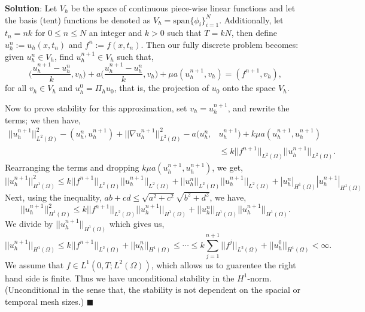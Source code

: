 \documentclass[11pt]{article}
\begin{document}
\textbf{Solution}: Let $V_h$ be the space of continuous piece-wise linear functions and let the basis (tent) functions be denoted as $V_h = \text{span}\{\phi_i\}_{i=1}^N$.
Additionally, let $t_n = nk$ for $0 \leq n \leq N$ an integer and $k > 0$ such that $T = kN$, then define $u_h^n := u_h(x, t_n)$ and $f^n := f(x, t_n)$.
Then our fully discrete problem becomes: given $u^n_h \in V_h$, find $u^{n+1}_h \in V_h$ such that,
\begin{equation*}
    \big( \frac{u^{n+1}_h - u^n_h}{k}, v_h \big) + a\big( \frac{u^{n+1}_h - u^n_h}{k}, v_h \big) + \mu a(u^{n+1}_h, v_h) = (f^{n+1},v_h),
\end{equation*}
for all $v_h \in V_h$ and $u^0_h = \Pi_h u_0$, that is, the projection of $u_0$ onto the space $V_h$.

Now to prove stability for this approximation, set $v_h = u^{n+1}_h$, and rewrite the terms; we then have,
\begin{equation*}
\begin{split}
    ||u^{n+1}_h||^2_{L^2(\Omega)} - (u^n_h, u^{n+1}_h) + ||\nabla u^{n+1}_h||^2_{L^2(\Omega)} - a( u^n_h, &u^{n+1}_h) + k\mu a(u^{n+1}_h, u^{n+1}_h) \\
    &\leq k||f^{n+1}||_{L^2(\Omega)} ||u^{n+1}_h||_{L^2(\Omega)}.
\end{split}
\end{equation*}
Rearranging the terms and dropping $k\mu a(u^{n+1}_h, u^{n+1}_h)$, we get,
\begin{equation*}
    ||u^{n+1}_h||^2_{H^1(\Omega)} \leq k||f^{n+1}||_{L^2(\Omega)} ||u^{n+1}_h||_{L^2(\Omega)} + ||u^n_h||_{L^2(\Omega)} ||u^{n+1}_h||_{L^2(\Omega)} + |u^n_h|_{H^1(\Omega)} |u^{n+1}_h|_{H^1(\Omega)}
\end{equation*}
Next, using the inequality, $ab + cd \leq \sqrt{a^2 + c^2}\sqrt{b^2 + d^2}$, we have,
\begin{equation*}
    ||u^{n+1}_h||^2_{H^1(\Omega)} \leq k||f^{n+1}||_{L^2(\Omega)} ||u^{n+1}_h||_{H^1(\Omega)} + ||u^n_h||_{H^1(\Omega)} ||u^{n+1}_h||_{H^1(\Omega)}.
\end{equation*}
We divide by $||u^{n+1}_h||_{H^1(\Omega)}$ which gives us,
\begin{equation*}
    ||u^{n+1}_h||_{H^1(\Omega)} \leq k||f^{n+1}||_{L^2(\Omega)} + ||u^n_h||_{H^1(\Omega)} \leq \cdots \leq k \sum_{j = 1}^{n+1} ||f^j||_{L^2(\Omega)} + ||u^0_h||_{H^1(\Omega)} < \infty.
\end{equation*}
We assume that $f \in L^1(0,T; L^2(\Omega))$, which allows us to guarentee the right hand side is finite.
Thus we have unconditional stability in the $H^1$-norm.
(Unconditional in the sense that, the stability is not dependent on the spacial or temporal mesh sizes.)
$\blacksquare$
\end{document}

